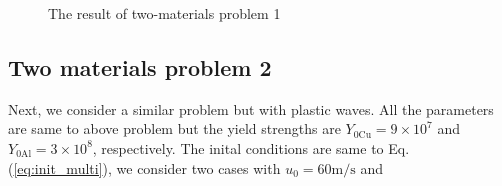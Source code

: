 \documentclass{article}
\numberwithin{equation}{section}
\numberwithin{table}{section}
\begin{document}
\begin{figure}
	  \caption{ The result of two-materials  problem 1}
	\end{figure}

\subsection{Two materials problem 2}
Next, we consider a similar problem but with plastic waves. All the parameters are same to above problem but the yield strengths are  $Y_{0\text{Cu}} = 9\times 10^7$ and $Y_{0\text{Al}} = 3\times 10^8$, respectively. The inital conditions are same to Eq.(\ref{eq:init_multi}), we consider two cases with $u_0 = 60 \text{m}/\text{s}$ and 
\end{document}
